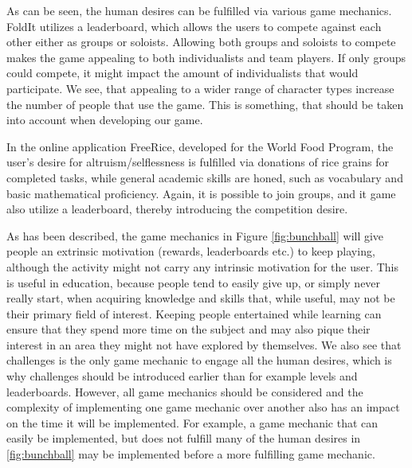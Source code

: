 As can be seen, the human desires can be fulfilled via various game mechanics.
FoldIt utilizes a leaderboard, which allows the users to compete against each other either as groups or soloists. Allowing both groups and soloists to compete makes the game appealing to both individualists and team players. If only groups could compete, it might impact the amount of individualists that would participate. We see, that appealing to a wider range of character types increase the number of people that use the game. This is something, that should be taken into account when developing our game.\newline

In the online application FreeRice, developed for the World Food Program, the user's desire for altruism/selflessness is fulfilled via donations of rice grains for completed tasks, while general academic skills are honed, such as vocabulary and basic mathematical proficiency. Again, it is possible to join groups, and it game also utilize a leaderboard, thereby introducing the competition desire.\cite{freerice}\newline

As has been described, the game mechanics in Figure \ref{fig:bunchball} will give people an extrinsic motivation (rewards, leaderboards etc.) to keep playing, although the activity might not carry any intrinsic motivation for the user. This is useful in education, because people tend to easily give up, or simply never really start, when acquiring knowledge and skills that, while useful, may not be their primary field of interest. Keeping people entertained while learning can ensure that they spend more time on the subject and may also pique their interest in an area they might not have explored by themselves. We also see that challenges is the only game mechanic to engage all the human desires, which is why challenges should be introduced earlier than for example levels and leaderboards. However, all game mechanics should be considered and the complexity of implementing one game mechanic over another also has an impact on the time it will be implemented. For example, a game mechanic that can easily be implemented, but does not fulfill many of the human desires in \autoref{fig:bunchball} may be implemented before a more fulfilling game mechanic.
